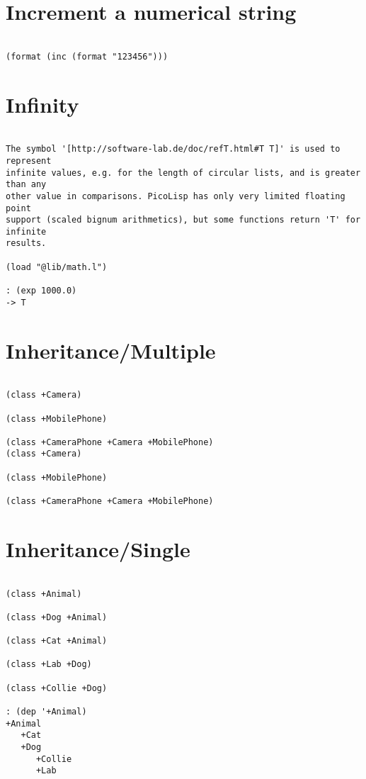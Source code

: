 \section*{Increment a numerical string}

\begin{verbatim}

(format (inc (format "123456")))

\end{verbatim}

\section*{Infinity}

\begin{verbatim}

The symbol '[http://software-lab.de/doc/refT.html#T T]' is used to represent
infinite values, e.g. for the length of circular lists, and is greater than any
other value in comparisons. PicoLisp has only very limited floating point
support (scaled bignum arithmetics), but some functions return 'T' for infinite
results.

(load "@lib/math.l")

: (exp 1000.0)
-> T

\end{verbatim}

\section*{Inheritance/Multiple}

\begin{verbatim}

(class +Camera)

(class +MobilePhone)

(class +CameraPhone +Camera +MobilePhone)
(class +Camera)

(class +MobilePhone)

(class +CameraPhone +Camera +MobilePhone)

\end{verbatim}

\section*{Inheritance/Single}

\begin{verbatim}

(class +Animal)

(class +Dog +Animal)

(class +Cat +Animal)

(class +Lab +Dog)

(class +Collie +Dog)

: (dep '+Animal)
+Animal
   +Cat
   +Dog
      +Collie
      +Lab

\end{verbatim}

